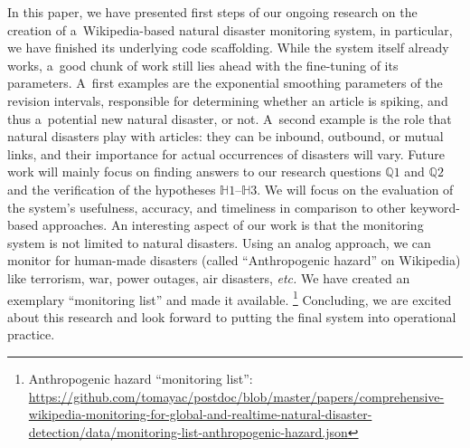 \documentclass[letterpaper]{article}
\begin{document}
In this paper, we have presented first steps of our ongoing research
on the creation of a~Wikipedia-based natural disaster monitoring system,
in particular, we have finished its underlying code scaffolding.
While the system itself already works, a~good chunk of work still lies ahead
with the fine-tuning of its parameters.
A~first examples are the exponential smoothing parameters
of the revision intervals, responsible for determining whether an article
is spiking, and thus a~potential new natural disaster, or not.
A~second example is the role that natural disasters play with articles:
they can be inbound, outbound, or mutual links,
and their importance for actual occurrences of disasters will vary.
Future work will mainly focus on finding answers to our research questions
$\mathbb{Q}1$ and $\mathbb{Q}2$ and the verification of the hypotheses
$\mathbb{H}1$--$\mathbb{H}3$.
We will focus on the evaluation of the system's usefulness, accuracy,
and timeliness in comparison to other keyword-based approaches.
An interesting aspect of our work is that the monitoring system
is not limited to natural disasters.
Using an analog approach, we can monitor for human-made disasters
(called ``Anthropogenic hazard'' on Wikipedia)
like terrorism, war, power outages, air disasters, \emph{etc.}
We have created an exemplary ``monitoring list'' and made it available.%
\footnote{Anthropogenic hazard ``monitoring list'':
\url{https://github.com/tomayac/postdoc/blob/master/papers/comprehensive-wikipedia-monitoring-for-global-and-realtime-natural-disaster-detection/data/monitoring-list-anthropogenic-hazard.json}}
Concluding, we are excited about this research
and look forward to putting the final system into operational practice.



\end{document}
